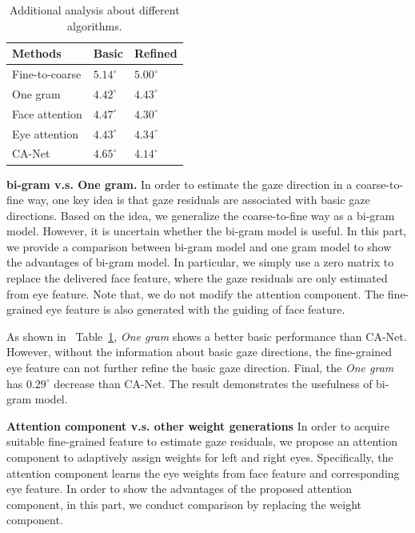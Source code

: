 \documentclass[letterpaper]{article} %
\def\bm #1{\boldsymbol{#1}}%
\newcommand{\Tref}[1]{Table~\ref{#1}}
\begin{document}
\begin{table}[t]
	\renewcommand\arraystretch{1.3}
	\normalsize
	\caption{Additional analysis about different algorithms.}
	\begin{center}

		\begin{tabular}{|p{3.0cm}<{\centering}|p{1.9cm}<{\centering}|p{1.9cm}<{\centering}|}
			\hline

			Methods& Basic& 	Refined \\
			\hline
			Fine-to-coarse			&$5.14^{\circ}$		&$5.00^{\circ}$		\\

			One gram				&$4.42^{\circ}$ 	&$4.43^{\circ}$	 \\

			Face attention				&$4.47^{\circ}$		&$4.30^{\circ}$				\\

			Eye attention				&$4.43^{\circ}$		&$4.34^{\circ}$			\\
			\hline
			CA-Net					&$\bm{4.65^{\circ}}$		&$\bm{4.14^{\circ}}$			\\
			\hline
		\end{tabular}
		\label{table:attention}
	\end{center}
\end{table}
\textbf{bi-gram v.s. One gram.}
In order to estimate the gaze direction in a coarse-to-fine way, one key idea is that gaze residuals are associated with basic gaze directions.
Based on the idea, we generalize the coarse-to-fine way as a bi-gram model.
However, it is uncertain whether the bi-gram model is useful.
In this part, we provide a comparison between bi-gram model and one gram model to show the advantages of bi-gram model.
In particular, we simply use a zero matrix to replace the delivered face feature, where the gaze residuals are only estimated from eye feature.
Note that, we do not modify the attention component. The fine-grained eye feature is also generated with the guiding of face feature.

As shown in ~\Tref{table:attention}, \emph{One gram} shows a better basic performance than CA-Net.
However, without the information about basic gaze directions, the fine-grained eye feature can not further refine the basic gaze direction.
Final, the \emph{One gram} has $0.29^{\circ}$ decrease than CA-Net.
The result demonstrates the usefulness of bi-gram model.

\textbf{Attention component v.s. other weight generations}
In order to acquire suitable fine-grained feature to estimate gaze residuals,
we propose an attention component to adaptively assign weights for left and right eyes.
Specifically, the attention component learns the eye weights from face feature and corresponding eye feature.
In order to show the advantages of the proposed attention component, in this part, we conduct comparison by replacing the weight component.
\end{document}
